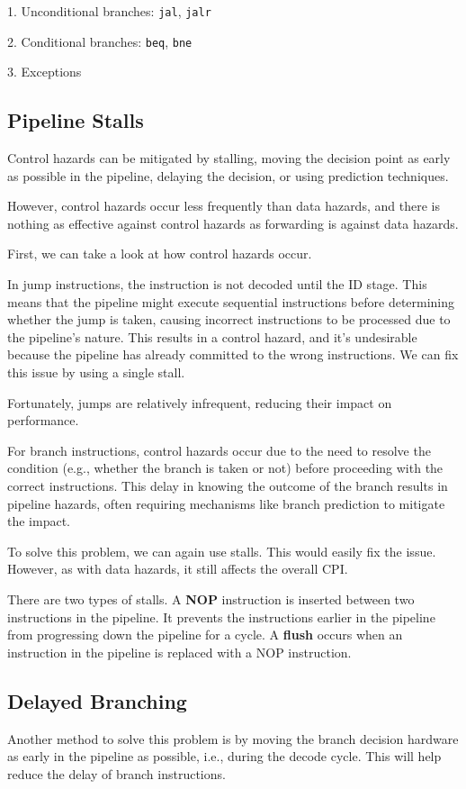 1. Unconditional branches: \verb|jal|, \verb|jalr|

2. Conditional branches: \verb|beq|, \verb|bne|

3. Exceptions

\subsection{Pipeline Stalls}
Control hazards can be mitigated by stalling, moving the decision point as early as possible in the pipeline, delaying the decision, or using prediction techniques.

However, control hazards occur less frequently than data hazards, and there is nothing as effective against control hazards as forwarding is against data hazards.

First, we can take a look at how control hazards occur.

In jump instructions, the instruction is not decoded until the ID stage. This means that the pipeline might execute sequential instructions before determining whether the jump is taken, causing incorrect instructions to be processed due to the pipeline's nature. This results in a control hazard, and it's undesirable because the pipeline has already committed to the wrong instructions. We can fix this issue by using a single stall. 

Fortunately, jumps are relatively infrequent, reducing their impact on performance.

For branch instructions, control hazards occur due to the need to resolve the condition (e.g., whether the branch is taken or not) before proceeding with the correct instructions. This delay in knowing the outcome of the branch results in pipeline hazards, often requiring mechanisms like branch prediction to mitigate the impact.

To solve this problem, we can again use stalls. This would easily fix the issue. However, as with data hazards, it still affects the overall CPI.

\begin{remark}
  There are two types of stalls. A \textbf{NOP} instruction is inserted between two instructions in the pipeline. It prevents the instructions earlier in the pipeline from progressing down the pipeline for a cycle. A \textbf{flush} occurs when an instruction in the pipeline is replaced with a NOP instruction.
\end{remark}

\subsection{Delayed Branching}
Another method to solve this problem is by moving the branch decision hardware as early in the pipeline as possible, i.e., during the decode cycle. This will help reduce the delay of branch instructions.

